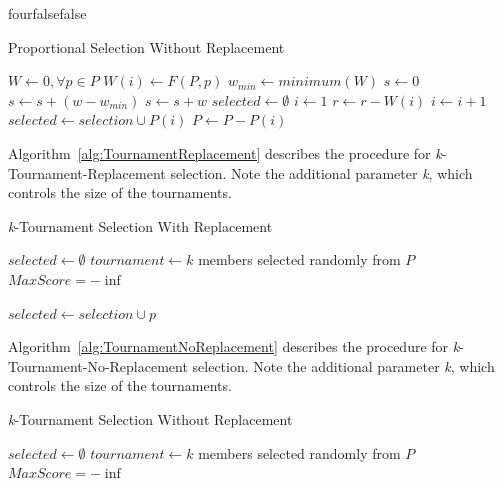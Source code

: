 \documentclass[times,12pt,titlepage]{mstogs}
\begin{document}
\begin{ThesisAppendix}{four}{false}{false}
\begin{algorithm}
\caption{Proportional Selection Without Replacement}
\label{alg:ProportionalNoReplacement}
\begin{algorithmic}[1]
 \label{proc:ProportionalNoReplacement}
	\State $W \leftarrow 0,\forall p \in P$
		\State $W(i) \leftarrow F(P,p)$
	\EndFor
	\State $w_{min} \leftarrow minimum(W)$	
	\State $s \leftarrow 0$
			\State $s \leftarrow s + (w - w_{min} )$			
		\Else
			\State $s \leftarrow s + w$		
		\EndIf	
	\EndFor
	\State $selected \leftarrow \emptyset$
		\State $i \leftarrow 1$
			\State $r \leftarrow r - W(i)$
			\State $i \leftarrow i + 1$
		\EndWhile	
		\State $selected \leftarrow selection \cup P(i)$
		\State $P \leftarrow P - P(i)$
	\EndFor
\EndProcedure
\end{algorithmic}
\end{algorithm}

Algorithm~\ref{alg:TournamentReplacement} describes the procedure for \textit{k}-Tournament-Replacement selection. Note the additional parameter \textit{k}, which controls the size of the tournaments.

\begin{algorithm}
\caption{\textit{k}-Tournament Selection With Replacement}
\label{alg:TournamentReplacement}
\begin{algorithmic}[1]
 \label{proc:TournamentReplacement}
	\State $selected \leftarrow \emptyset$
		\State $tournament \leftarrow k$ members selected randomly from $P$
		\State $MaxScore = -\inf$

			\EndIf			
		\EndFor
		\State $selected \leftarrow selection \cup p$
	\EndFor
\EndFunction
\end{algorithmic}
\end{algorithm}

Algorithm~\ref{alg:TournamentNoReplacement} describes the procedure for \textit{k}-Tournament-No-Replacement selection. Note the additional parameter \textit{k}, which controls the size of the tournaments.

\begin{algorithm}
\caption{\textit{k}-Tournament Selection Without Replacement}
\label{alg:TournamentNoReplacement}
\begin{algorithmic}[1]
 \label{proc:TournamentNoReplacement}
	\State $selected \leftarrow \emptyset$
		\State $tournament \leftarrow k$ members selected randomly from $P$
		\State $MaxScore = -\inf$


\end{algorithmic}
\end{algorithm}
\end{ThesisAppendix}
\end{document}
